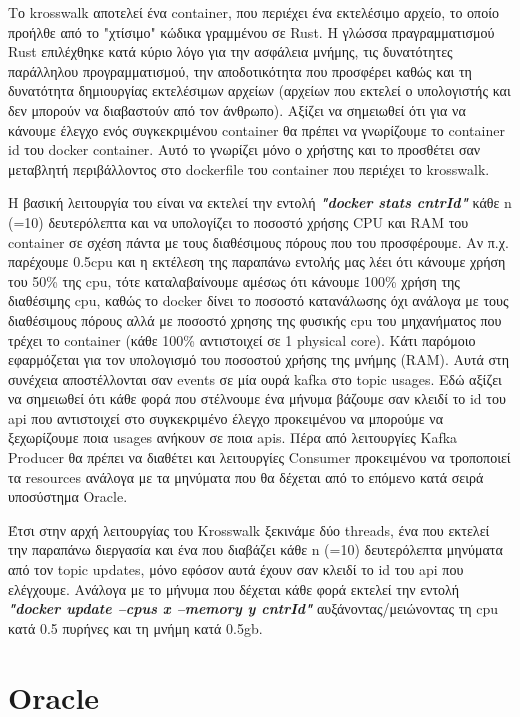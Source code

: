 Το krosswalk αποτελεί ένα container, που περιέχει ένα εκτελέσιμο αρχείο, το οποίο προήλθε από το "χτίσιμο" κώδικα γραμμένου σε Rust. H γλώσσα πραγραμματισμού Rust επιλέχθηκε κατά κύριο λόγο για την ασφάλεια μνήμης, τις δυνατότητες παράλληλου προγραμματισμού, την αποδοτικότητα που προσφέρει καθώς και τη δυνατότητα δημιουργίας εκτελέσιμων αρχείων (αρχείων που εκτελεί ο υπολογιστής και δεν μπορούν να διαβαστούν από τον άνθρωπο). Αξίζει να σημειωθεί ότι για να κάνουμε έλεγχο ενός συγκεκριμένου container θα πρέπει να γνωρίζουμε το container id του docker container. Αυτό το γνωρίζει μόνο ο χρήστης και το προσθέτει σαν μεταβλητή περιβάλλοντος στο dockerfile του container που περιέχει το krosswalk.

Η βασική λειτουργία του είναι να εκτελεί την εντολή \textit{\textbf{"docker stats cntrId"}} κάθε n (=10) δευτερόλεπτα και να υπολογίζει το ποσοστό χρήσης CPU και RAM του container σε σχέση πάντα με τους διαθέσιμους πόρους που του προσφέρουμε. Αν π.χ. παρέχουμε 0.5cpu και η εκτέλεση της παραπάνω εντολής μας λέει ότι κάνουμε χρήση του 50\% της cpu, τότε καταλαβαίνουμε αμέσως ότι κάνουμε 100\% χρήση της διαθέσιμης cpu, καθώς το docker δίνει το ποσοστό κατανάλωσης όχι ανάλογα με τους διαθέσιμους πόρους αλλά με ποσοστό χρησης της φυσικής cpu του μηχανήματος που τρέχει το container (κάθε 100\% αντιστοιχεί σε 1 physical core). Κάτι παρόμοιο εφαρμόζεται για τον υπολογισμό του ποσοστού χρήσης της μνήμης (RAM). Αυτά στη συνέχεια αποστέλλονται σαν events σε μία ουρά kafka στο topic usages. Εδώ αξίζει να σημειωθεί ότι κάθε φορά που στέλνουμε ένα μήνυμα βάζουμε σαν κλειδί το id του api που αντιστοιχεί στο συγκεκριμένο έλεγχο προκειμένου να μπορούμε να ξεχωρίζουμε ποια usages ανήκουν σε ποια apis. Πέρα από λειτουργίες Kafka Producer θα πρέπει να διαθέτει και λειτουργίες Consumer προκειμένου να τροποποιεί τα resources ανάλογα με τα μηνύματα που θα δέχεται από το επόμενο κατά σειρά υποσύστημα Oracle.

Έτσι στην αρχή λειτουργίας του Krosswalk ξεκινάμε δύο threads, ένα που εκτελεί την παραπάνω διεργασία και ένα που διαβάζει κάθε n (=10) δευτερόλεπτα μηνύματα από τον topic updates, μόνο εφόσον αυτά έχουν σαν κλειδί το id του api που ελέγχουμε. Ανάλογα με το μήνυμα που δέχεται κάθε φορά εκτελεί την εντολή 
\textit{\textbf{"docker update --cpus x --memory y cntrId"}} αυξάνοντας/μειώνοντας τη cpu κατά 0.5 πυρήνες και τη μνήμη κατά 0.5gb. 

\section{Oracle}
\label{section:lychte_oracle}

